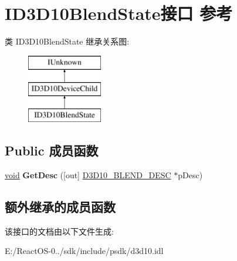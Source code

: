 \hypertarget{interface_i_d3_d10_blend_state}{}\section{I\+D3\+D10\+Blend\+State接口 参考}
\label{interface_i_d3_d10_blend_state}
类 I\+D3\+D10\+Blend\+State 继承关系图\+:\begin{figure}[H]
\begin{center}
\leavevmode
\includegraphics[height=3.000000cm]{interface_i_d3_d10_blend_state}
\end{center}
\end{figure}
\subsection*{Public 成员函数}
\begin{DoxyCompactItemize}
\item 
\mbox{\label{interface_i_d3_d10_blend_state_a230cf9b3dd143f9b8a0f1f4534f728c4}} 
\hyperlink{interfacevoid}{void} {\bfseries Get\+Desc} (\mbox{[}out\mbox{]} \hyperlink{struct_d3_d10___b_l_e_n_d___d_e_s_c}{D3\+D10\+\_\+\+B\+L\+E\+N\+D\+\_\+\+D\+E\+SC} $\ast$p\+Desc)
\end{DoxyCompactItemize}
\subsection*{额外继承的成员函数}


该接口的文档由以下文件生成\+:\begin{DoxyCompactItemize}
\item 
E\+:/\+React\+O\+S-\/0../sdk/include/psdk/d3d10.\+idl\end{DoxyCompactItemize}
